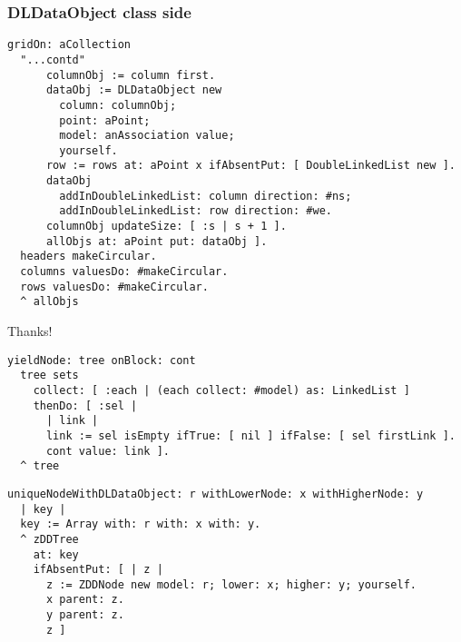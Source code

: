 \documentclass{beamer}
\begin{document}
\begin{frame}[fragile]
\frametitle{DLDataObject class side}
\begin{verbatim}
gridOn: aCollection
  "...contd"
      columnObj := column first.
      dataObj := DLDataObject new
        column: columnObj;
        point: aPoint;
        model: anAssociation value;
        yourself.
      row := rows at: aPoint x ifAbsentPut: [ DoubleLinkedList new ].
      dataObj
        addInDoubleLinkedList: column direction: #ns;
        addInDoubleLinkedList: row direction: #we.
      columnObj updateSize: [ :s | s + 1 ].
      allObjs at: aPoint put: dataObj ].
  headers makeCircular.
  columns valuesDo: #makeCircular.
  rows valuesDo: #makeCircular.
  ^ allObjs
\end{verbatim}
\end{frame}


\begin{frame}{ }
\Huge Thanks!
\end{frame}

\begin{frame}[fragile]
\begin{verbatim}
yieldNode: tree onBlock: cont
  tree sets
    collect: [ :each | (each collect: #model) as: LinkedList ]
    thenDo: [ :sel | 
      | link |
      link := sel isEmpty ifTrue: [ nil ] ifFalse: [ sel firstLink ].
      cont value: link ].
  ^ tree
\end{verbatim}
\vfill
\begin{verbatim}
uniqueNodeWithDLDataObject: r withLowerNode: x withHigherNode: y
  | key |
  key := Array with: r with: x with: y.
  ^ zDDTree
    at: key
    ifAbsentPut: [ | z |
      z := ZDDNode new model: r; lower: x; higher: y; yourself.
      x parent: z.
      y parent: z.
      z ]
\end{verbatim}
\end{frame}
\end{document}

